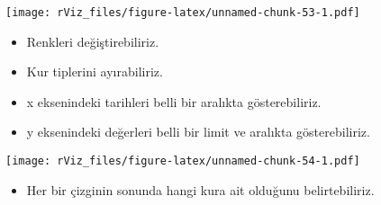 \documentclass[
]{book}
\newenvironment{Shaded}{\begin{snugshade}}{\end{snugshade}}
\newcommand{\DataTypeTok}[1]{\textcolor[rgb]{0.13,0.29,0.53}{#1}}
\newcommand{\DecValTok}[1]{\textcolor[rgb]{0.00,0.00,0.81}{#1}}
\newcommand{\KeywordTok}[1]{\textcolor[rgb]{0.13,0.29,0.53}{\textbf{#1}}}
\newcommand{\NormalTok}[1]{#1}
\newcommand{\OperatorTok}[1]{\textcolor[rgb]{0.81,0.36,0.00}{\textbf{#1}}}
\newcommand{\StringTok}[1]{\textcolor[rgb]{0.31,0.60,0.02}{#1}}
\providecommand{\tightlist}{%
  \setlength{\itemsep}{0pt}\setlength{\parskip}{0pt}}
\begin{document}
\texttt{[image: rViz\_files/figure-latex/unnamed-chunk-53-1.pdf]}

\begin{itemize}
\item
  Renkleri değiştirebiliriz.
\item
  Kur tiplerini ayırabiliriz.
\item
  x eksenindeki tarihleri belli bir aralıkta gösterebiliriz.
\item
  y eksenindeki değerleri belli bir limit ve aralıkta gösterebiliriz.
\end{itemize}

\begin{Shaded}
\end{Shaded}

\texttt{[image: rViz\_files/figure-latex/unnamed-chunk-54-1.pdf]}

\begin{itemize}
\tightlist
\item
  Her bir çizginin sonunda hangi kura ait olduğunu belirtebiliriz.
\end{itemize}
\end{document}

